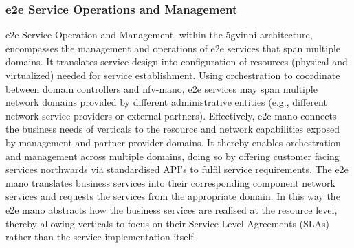         \subsubsection{\acrshort{e2e} Service Operations and Management}
        \acrshort{e2e} Service Operation and Management, within the \acrshort{5gvinni} architecture, encompasses the management and operations of \acrshort{e2e} services that span multiple domains. It translates service design into configuration of resources (physical and virtualized) needed for service establishment. Using orchestration to coordinate between domain controllers and \acrshort{nfv}-\acrshort{mano}, \acrshort{e2e} services may span multiple network domains provided by different administrative entities (e.g., different network service providers or external partners).
        Effectively, \acrshort{e2e} \acrshort{mano} connects the business needs of verticals to the resource and network capabilities exposed by management and partner provider domains. It thereby enables orchestration and management across multiple domains, doing so by offering customer facing services northwards via standardised API’s to fulfil service requirements. The \acrshort{e2e} \acrshort{mano} translates business services into their corresponding component network services and requests the services from the appropriate domain. In this way the \acrshort{e2e} \acrshort{mano} abstracts how the business services are realised at the resource level, thereby allowing verticals to focus on their Service Level Agreements (SLAs) rather than the service implementation itself.

